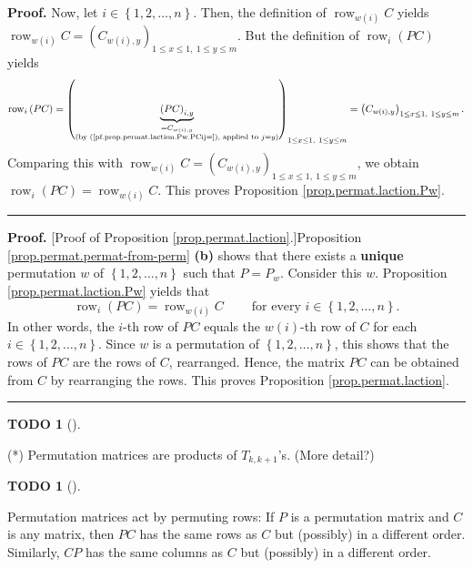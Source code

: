 \documentclass[numbers=enddot,12pt,final,onecolumn,notitlepage]{scrartcl}%
\theoremstyle{definition}
\newtheorem{quest}[theo]{TODO}
\newenvironment{todo}[1][]
{\begin{quest}[#1]\begin{leftbar}}
{\end{leftbar}\end{quest}}
\newenvironment{proof}[1][Proof]{\noindent\textbf{#1.} }{\ \rule{0.5em}{0.5em}}
\newenvironment{noncompile}{}{}
\begin{document}
\begin{proof}
Now, let $i\in\left\{  1,2,\ldots,n\right\}  $. Then, the definition of
$\operatorname*{row}\nolimits_{w\left(  i\right)  }C$ yields
$\operatorname*{row}\nolimits_{w\left(  i\right)  }C=\left(  C_{w\left(
i\right)  ,y}\right)  _{1\leq x\leq1,\ 1\leq y\leq m}$. But the definition of
$\operatorname*{row}\nolimits_{i}\left(  PC\right)  $ yields%
\[
\operatorname*{row}\nolimits_{i}\left(  PC\right)  =\left(
\underbrace{\left(  PC\right)  _{i,y}}_{\substack{=C_{w\left(  i\right)
,y}\\\text{(by (\ref{pf.prop.permat.laction.Pw.PCij=}), applied to
}j=y\text{)}}}\right)  _{1\leq x\leq1,\ 1\leq y\leq m}=\left(  C_{w\left(
i\right)  ,y}\right)  _{1\leq x\leq1,\ 1\leq y\leq m}.
\]
Comparing this with $\operatorname*{row}\nolimits_{w\left(  i\right)
}C=\left(  C_{w\left(  i\right)  ,y}\right)  _{1\leq x\leq1,\ 1\leq y\leq m}$,
we obtain $\operatorname*{row}\nolimits_{i}\left(  PC\right)
=\operatorname*{row}\nolimits_{w\left(  i\right)  }C$. This proves Proposition
\ref{prop.permat.laction.Pw}.
\end{proof}

\begin{proof}
[Proof of Proposition \ref{prop.permat.laction}.]Proposition
\ref{prop.permat.permat-from-perm} \textbf{(b)} shows that there exists a
\textbf{unique} permutation $w$ of $\left\{  1,2,\ldots,n\right\}  $ such that
$P=P_{w}$. Consider this $w$. Proposition \ref{prop.permat.laction.Pw} yields
that%
\[
\operatorname*{row}\nolimits_{i}\left(  PC\right)  =\operatorname*{row}%
\nolimits_{w\left(  i\right)  }C\ \ \ \ \ \ \ \ \ \ \text{for every }%
i\in\left\{  1,2,\ldots,n\right\}  .
\]
In other words, the $i$-th row of $PC$ equals the $w\left(  i\right)  $-th row
of $C$ for each $i\in\left\{  1,2,\ldots,n\right\}  $. Since $w$ is a
permutation of $\left\{  1,2,\ldots,n\right\}  $, this shows that the rows of
$PC$ are the rows of $C$, rearranged. Hence, the matrix $PC$ can be obtained
from $C$ by rearranging the rows. This proves Proposition
\ref{prop.permat.laction}.
\end{proof}

\begin{noncompile}
\begin{todo}
(*) Permutation matrices are products of $T_{k,k+1}$'s. (More detail?)
\end{todo}

\begin{todo}
Permutation matrices act by permuting rows: If $P$ is a permutation matrix and
$C$ is any matrix, then $PC$ has the same rows as $C$ but (possibly) in a
different order. Similarly, $CP$ has the same columns as $C$ but (possibly) in
a different order.
\end{todo}
\end{noncompile}
\end{document}

